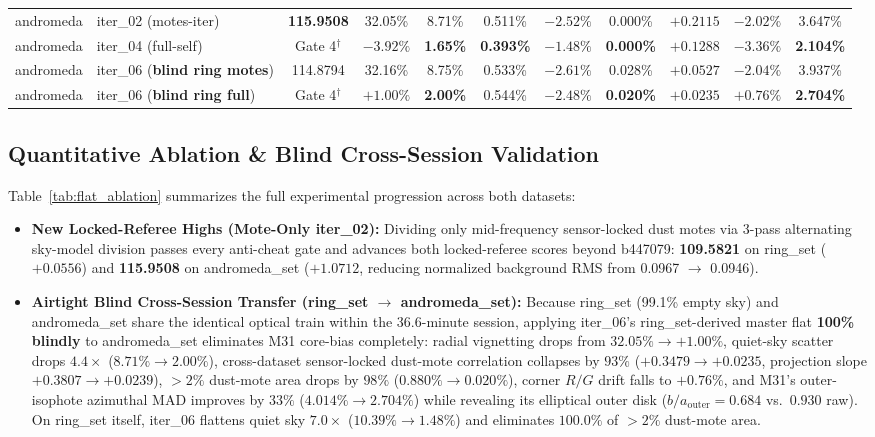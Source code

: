 \documentclass[10pt,twocolumn,letterpaper]{article}
\DeclareRobustCommand{\code}[1]{\texttt{#1}}
\def\code#1{#1}%
\begin{document}
\begin{table}[t]
{\begin{tabular}{@{}llccccccccc@{}}
    \code{andromeda} & \code{iter\_02} (\code{motes-iter}) & \textbf{115.9508} & 32.05\% & 8.71\% & 0.511\% & $-2.52\%$ & 0.000\% & $+0.2115$ & $-2.02\%$ & 3.647\% \\
    \code{andromeda} & \code{iter\_04} (\code{full-self}) & Gate 4$^\dagger$ & $-3.92\%$ & \textbf{1.65\%} & \textbf{0.393\%} & \textbf{$-1.48\%$} & \textbf{0.000\%} & $+0.1288$ & $-3.36\%$ & \textbf{2.104\%} \\
    \code{andromeda} & \code{iter\_06} (\textbf{blind \code{ring} motes}) & 114.8794 & 32.16\% & 8.75\% & 0.533\% & $-2.61\%$ & 0.028\% & $+0.0527$ & $-2.04\%$ & 3.937\% \\
    \code{andromeda} & \code{iter\_06} (\textbf{blind \code{ring} full}) & Gate 4$^\dagger$ & \textbf{$+1.00\%$} & \textbf{2.00\%} & 0.544\% & $-2.48\%$ & \textbf{0.020\%} & \textbf{$+0.0235$} & \textbf{$+0.76\%$} & \textbf{2.704\%} \\
    \bottomrule
  \end{tabular}%
  }
\end{table}

\subsection{Quantitative Ablation \& Blind Cross-Session Validation}

Table~\ref{tab:flat_ablation} summarizes the full experimental progression across both datasets:
\begin{itemize}
  \item \textbf{New Locked-Referee Highs (Mote-Only \code{iter\_02}):} Dividing only mid-frequency sensor-locked dust motes via 3-pass alternating sky-model division passes every anti-cheat gate and advances both locked-referee scores beyond \code{b447079}: \textbf{\code{109.5821}} on \code{ring\_set} ($+0.0556$) and \textbf{\code{115.9508}} on \code{andromeda\_set} ($+1.0712$, reducing normalized background RMS from \code{0.0967} $\to$ \code{0.0946}).
  \item \textbf{Airtight Blind Cross-Session Transfer (\code{ring\_set} $\to$ \code{andromeda\_set}):} Because \code{ring\_set} (99.1\% empty sky) and \code{andromeda\_set} share the identical optical train within the 36.6-minute session, applying \code{iter\_06}'s \code{ring\_set}-derived master flat \textbf{100\% blindly} to \code{andromeda\_set} eliminates M31 core-bias completely: radial vignetting drops from \textbf{$32.05\% \to +1.00\%$}, quiet-sky scatter drops $4.4\times$ ($8.71\% \to 2.00\%$), cross-dataset sensor-locked dust-mote correlation collapses by \textbf{$93\%$} ($+0.3479 \to +0.0235$, projection slope $+0.3807 \to +0.0239$), $>2\%$ dust-mote area drops by $98\%$ ($0.880\% \to 0.020\%$), corner $R/G$ drift falls to $+0.76\%$, and M31's outer-isophote azimuthal MAD improves by $33\%$ ($4.014\% \to 2.704\%$) while revealing its elliptical outer disk ($b/a_{\text{outer}} = 0.684$ vs.\ $0.930$ raw). On \code{ring\_set} itself, \code{iter\_06} flattens quiet sky $7.0\times$ ($10.39\% \to 1.48\%$) and eliminates $100.0\%$ of $>2\%$ dust-mote area.
\end{itemize}
\end{document}
